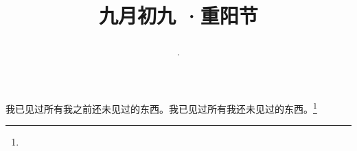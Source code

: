\title{\date[d=11,m=10,y=2024][year:cn-y,年,month:cn,day:cn,日,·,weekday]·九月初九 ·重阳节}
我已见过所有我之前还未见过的东西。我已见过所有我还未见过的东西。\footnote{ }


